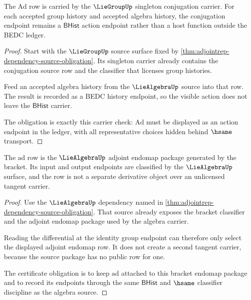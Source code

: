 \begin{theorem}
\label{thm:adjointrep-conjugation-carrier-obligation}
The $\mathrm{Ad}$ row is carried by the $\LieGroupUp$ singleton conjugation
carrier. For each accepted group history and accepted algebra history, the
conjugation endpoint remains a $\mathsf{BHist}$ action endpoint rather than a
host function outside the BEDC ledger.
\end{theorem}
\begin{proof}
Start with the $\LieGroupUp$ source surface fixed by
\autoref{thm:adjointrep-dependency-source-obligation}. Its singleton carrier
already contains the conjugation source row and the classifier that licenses
group histories.

Feed an accepted algebra history from the $\LieAlgebraUp$ source into that
row. The result is recorded as a BEDC history endpoint, so the visible action
does not leave the $\mathsf{BHist}$ carrier.

The obligation is exactly this carrier check: $\mathrm{Ad}$ must be displayed
as an action endpoint in the ledger, with all representative choices hidden
behind $\hsame$ transport.
\end{proof}

\begin{theorem}
\label{thm:adjointrep-differential-action-obligation}
The $\mathrm{ad}$ row is the $\LieAlgebraUp$ adjoint endomap package generated
by the bracket. Its input and output endpoints are classified by the
$\LieAlgebraUp$ surface, and the row is not a separate derivative object over
an unlicensed tangent carrier.
\end{theorem}
\begin{proof}
Use the $\LieAlgebraUp$ dependency named in
\autoref{thm:adjointrep-dependency-source-obligation}. That source already
exposes the bracket classifier and the adjoint endomap package used by the
algebra carrier.

Reading the differential at the identity group endpoint can therefore only
select the displayed adjoint endomap row. It does not create a second tangent
carrier, because the source package has no public row for one.

The certificate obligation is to keep $\mathrm{ad}$ attached to this bracket
endomap package and to record its endpoints through the same $\mathsf{BHist}$
and $\hsame$ classifier discipline as the algebra source.
\end{proof}

